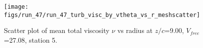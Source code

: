 \begin{figure}[H]
\centering
\texttt{[image: figs/run\_47/run\_47\_turb\_visc\_by\_vtheta\_vs\_r\_meshscatter]}
\caption{Scatter plot of mean total viscosity $\nu$ vs radius at $z/c$=9.00, $V_{free}$=27.08, station 5.}
\label{fig:run_47_turb_visc_by_vtheta_vs_r_meshscatter}
\end{figure}


